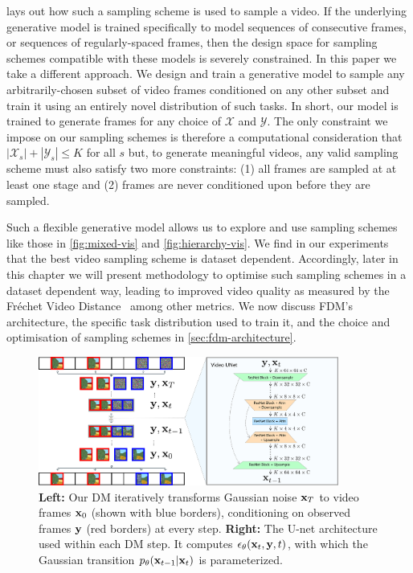  lays out how such a sampling scheme is used to sample a video. If the underlying generative model is trained specifically to model sequences of consecutive frames, or sequences of regularly-spaced frames, then the design space for sampling schemes compatible with these models is severely constrained. In this paper we take a  different approach.  We design and train a generative model to sample any arbitrarily-chosen subset of video frames conditioned on any other subset and train it using an entirely novel distribution of such tasks. In short, our model is trained to generate frames for any choice of $\mathcal{X}$ and $\mathcal{Y}$. The only constraint we impose on our sampling schemes is therefore a computational consideration that $|\mathcal{X}_s| + |\mathcal{Y}_s| \leq K$ for all $s$ but, to generate meaningful videos, any valid sampling scheme must also satisfy two more constraints: (1) all frames are sampled at at least one stage and (2) frames are never conditioned upon before they are sampled.

Such a flexible generative model allows us to explore and use sampling schemes like those in \cref{fig:mixed-vis} and \cref{fig:hierarchy-vis}.  We find in our experiments that the best video sampling scheme is dataset dependent. Accordingly, later in this chapter we will present methodology to optimise such sampling schemes in a dataset dependent way, leading to improved video quality as measured by the Fréchet Video Distance~\cite{unterthiner2018towards} among other metrics. We now discuss FDM's architecture, the specific task distribution  used to train it, and the choice and optimisation of sampling schemes in \cref{sec:fdm-architecture}.

\begin{figure}[t]
    \centering
    \includegraphics[width=0.88\textwidth]{figs/fdm/video-architecture-v8.pdf}
    \caption{\textbf{Left:} Our DM iteratively transforms Gaussian noise ${\mathbf{x}}_T$ to video frames ${\mathbf{x}}_0$ (shown with blue borders), conditioning on observed frames ${\mathbf{y}}$ (red borders) at every step. \textbf{Right:} The U-net architecture used within each DM step. It computes $\epsilon_\theta({\mathbf{x}}_t, {\mathbf{y}}, t)$, with which the Gaussian transition $p_\theta({\mathbf{x}}_{t-1}|{\mathbf{x}}_t)$ is parameterized.
    }
    \label{fig:architecture}
\end{figure}

